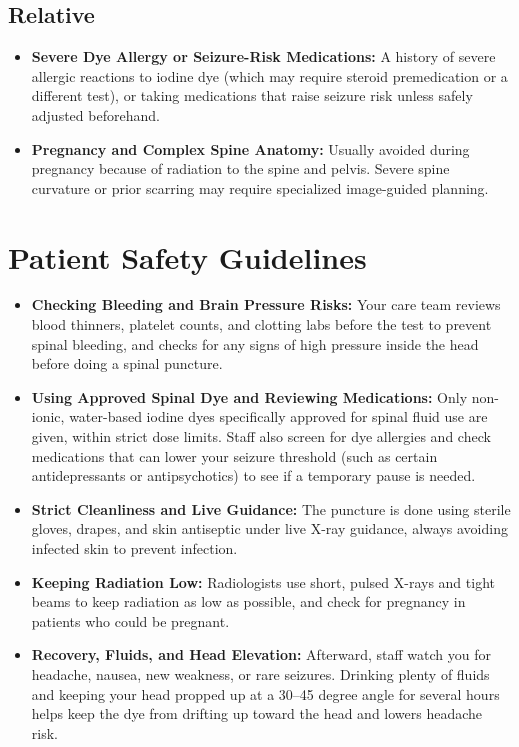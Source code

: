 \subsection{Relative}
\begin{itemize}
    \item \textbf{Severe Dye Allergy or Seizure-Risk Medications:} A history of severe allergic reactions to iodine dye (which may require steroid premedication or a different test), or taking medications that raise seizure risk unless safely adjusted beforehand.
    \item \textbf{Pregnancy and Complex Spine Anatomy:} Usually avoided during pregnancy because of radiation to the spine and pelvis. Severe spine curvature or prior scarring may require specialized image-guided planning.
\end{itemize}

\section{Patient Safety Guidelines}
\begin{itemize}
    \item \textbf{Checking Bleeding and Brain Pressure Risks:} Your care team reviews blood thinners, platelet counts, and clotting labs before the test to prevent spinal bleeding, and checks for any signs of high pressure inside the head before doing a spinal puncture.
    \item \textbf{Using Approved Spinal Dye and Reviewing Medications:} Only non-ionic, water-based iodine dyes specifically approved for spinal fluid use are given, within strict dose limits. Staff also screen for dye allergies and check medications that can lower your seizure threshold (such as certain antidepressants or antipsychotics) to see if a temporary pause is needed.
    \item \textbf{Strict Cleanliness and Live Guidance:} The puncture is done using sterile gloves, drapes, and skin antiseptic under live X-ray guidance, always avoiding infected skin to prevent infection.
    \item \textbf{Keeping Radiation Low:} Radiologists use short, pulsed X-rays and tight beams to keep radiation as low as possible, and check for pregnancy in patients who could be pregnant.
    \item \textbf{Recovery, Fluids, and Head Elevation:} Afterward, staff watch you for headache, nausea, new weakness, or rare seizures. Drinking plenty of fluids and keeping your head propped up at a 30--45 degree angle for several hours helps keep the dye from drifting up toward the head and lowers headache risk.
\end{itemize}


